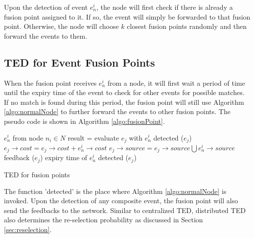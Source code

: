 Upon the detection of event \(e^i_n\), the node will first check if there is already a fusion point assigned to it. If so, the event will simply be forwarded to that fusion point. Otherwise, the node will choose \(k\) closest fusion points randomly and then forward the events to them.

\subsection{TED for Event Fusion Points}
When the fusion point receives \(e^i_n\) from a node, it will first wait a period of time until the expiry time of the event to check for other events for possible matches. If no match is found during this period, the fusion point will still use Algorithm \ref{algo:normalNode} to further forward the events to other fusion points. The pseudo code is shown in Algorithm \ref{algo:fusionPoint}.

\begin{algorithm}
\begin{algorithmic}
\REQUIRE \(e^i_n\) from node \(n_i\in N\)
			\STATE result = evaluate \(e_j\) with \(e^i_n\)
				\STATE detected (\(e_j\))
				\STATE \(e_j\rightarrow cost=e_j\rightarrow cost+e^i_n\rightarrow cost\)
				\STATE \(e_j\rightarrow source=e_j\rightarrow source\bigcup e^i_n\rightarrow source\)
				\STATE feedback (\(e_j\))
			\ENDIF
		\ENDIF
	\ENDFOR
\REQUIRE expiry time of \(e^i_n\)
	\STATE detected (\(e_j\))
\end{algorithmic}
\caption{TED for fusion points}
\label{algo:fusionPoint}
\end{algorithm}

The function 'detected' is the place where Algorithm \ref{algo:normalNode} is invoked. Upon the detection of any composite event, the fusion point will also send the feedbacks to the network. Similar to centralized TED, distributed TED also determines the re-selection probability as discussed in Section \ref{sec:reselection}.
